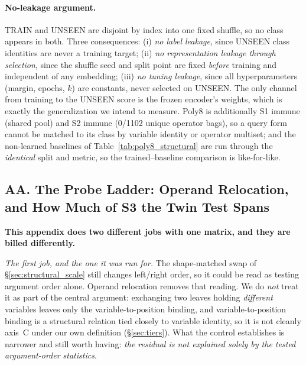 \paragraph{No-leakage argument.} TRAIN and UNSEEN are disjoint by index into one fixed shuffle, so no class appears in both. Three consequences: (i) \emph{no label leakage}, since UNSEEN class identities are never a training target; (ii) \emph{no representation leakage through selection}, since the shuffle seed and split point are fixed \emph{before} training and independent of any embedding; (iii) \emph{no tuning leakage}, since all hyperparameters (margin, epochs, $k$) are constants, never selected on UNSEEN. The only channel from training to the UNSEEN score is the frozen encoder's weights, which is exactly the generalization we intend to measure. Poly8 is additionally S1 immune (shared pool) and S2 immune (0/1102 unique operator bags), so a query form cannot be matched to its class by variable identity or operator multiset; and the non-learned baselines of Table~\ref{tab:poly8_structural} are run through the \emph{identical} split and metric, so the trained--baseline comparison is like-for-like.

\subsection*{AA. The Probe Ladder: Operand Relocation, and How Much of S3 the Twin Test Spans}

\textbf{This appendix does two different jobs with one matrix, and they are billed differently.}

\emph{The first job, and the one it was run for.} The shape-matched swap of \S\ref{sec:structural_scale} still changes left/right order, so it could be read as testing argument order alone. Operand relocation removes that reading. We do \emph{not} treat it as part of the central argument: exchanging two leaves holding \emph{different} variables leaves only the variable-to-position binding, and variable-to-position binding is a structural relation tied closely to variable identity, so it is not cleanly axis~C under our own definition (\S\ref{sec:tiers}). What the control establishes is narrower and still worth having: \emph{the residual is not explained solely by the tested argument-order statistics}.

